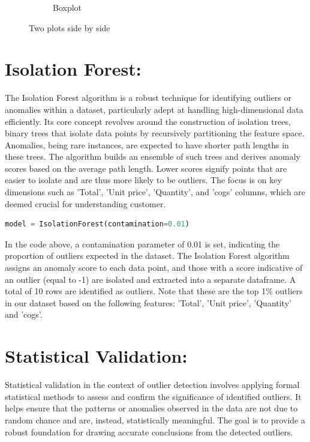 \begin{figure}[h]
\begin{subfigure}{0.5\textwidth}
        \caption{Boxplot}
        \label{fig:boxplot}
    \end{subfigure}
    \caption{Two plots side by side}
    \label{fig:bothplots}
\end{figure}

\newpage
\section{Isolation Forest:}
The Isolation Forest algorithm is a robust technique for identifying outliers or anomalies within a dataset, particularly adept at handling high-dimensional data efficiently. Its core concept revolves around the construction of isolation trees, binary trees that isolate data points by recursively partitioning the feature space. Anomalies, being rare instances, are expected to have shorter path lengths in these trees. The algorithm builds an ensemble of such trees and derives anomaly scores based on the average path length. Lower scores signify points that are easier to isolate and are thus more likely to be outliers.
\newline
The focus is on key dimensions such as 'Total', 'Unit price', 'Quantity', and 'cogs' columns, which are deemed crucial for understanding customer.
\newline 
\begin{lstlisting}[language=Python, frame=none]
model = IsolationForest(contamination=0.01)
\end{lstlisting}
\newline 
In the code above, a contamination parameter of 0.01 is set, indicating the proportion of outliers expected in the dataset. The Isolation Forest algorithm assigns an anomaly score to each data point, and those with a score indicative of an outlier (equal to -1) are isolated and extracted into a separate dataframe.
\newline 
A total of 10 rows are identified as outliers. Note that these are the top 1\% outliers in our dataset based on the following features: 'Total', 'Unit price', 'Quantity' and 'cogs'.
\section{Statistical Validation:}
Statistical validation in the context of outlier detection involves applying formal statistical methods to assess and confirm the significance of identified outliers. It helps ensure that the patterns or anomalies observed in the data are not due to random chance and are, instead, statistically meaningful. The goal is to provide a robust foundation for drawing accurate conclusions from the detected outliers.

